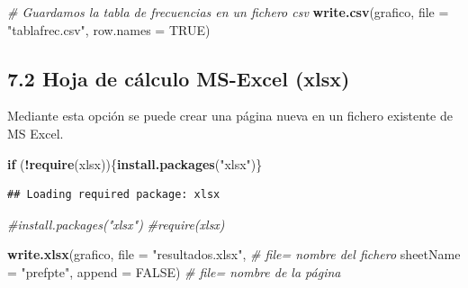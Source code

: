 \documentclass[
]{article}
\newenvironment{Shaded}{\begin{snugshade}}{\end{snugshade}}
\newcommand{\AttributeTok}[1]{\textcolor[rgb]{0.13,0.29,0.53}{#1}}
\newcommand{\CommentTok}[1]{\textcolor[rgb]{0.56,0.35,0.01}{\textit{#1}}}
\newcommand{\ConstantTok}[1]{\textcolor[rgb]{0.56,0.35,0.01}{#1}}
\newcommand{\ControlFlowTok}[1]{\textcolor[rgb]{0.13,0.29,0.53}{\textbf{#1}}}
\newcommand{\FunctionTok}[1]{\textcolor[rgb]{0.13,0.29,0.53}{\textbf{#1}}}
\newcommand{\NormalTok}[1]{#1}
\newcommand{\SpecialCharTok}[1]{\textcolor[rgb]{0.81,0.36,0.00}{\textbf{#1}}}
\newcommand{\StringTok}[1]{\textcolor[rgb]{0.31,0.60,0.02}{#1}}
\begin{document}
\begin{Shaded}
\begin{Highlighting}[]
\CommentTok{\# Guardamos la tabla de frecuencias en un fichero csv}
\FunctionTok{write.csv}\NormalTok{(grafico, }\AttributeTok{file =} \StringTok{"tablafrec.csv"}\NormalTok{, }\AttributeTok{row.names =} \ConstantTok{TRUE}\NormalTok{) }
\end{Highlighting}
\end{Shaded}

\hypertarget{hoja-de-cuxe1lculo-ms-excel-xlsx}{%
\subsection{7.2 Hoja de cálculo MS-Excel
(xlsx)}\label{hoja-de-cuxe1lculo-ms-excel-xlsx}}

Mediante esta opción se puede crear una página nueva en un fichero
existente de MS Excel.

\begin{Shaded}
\begin{Highlighting}[]
\ControlFlowTok{if}\NormalTok{ (}\SpecialCharTok{!}\FunctionTok{require}\NormalTok{(xlsx))\{}\FunctionTok{install.packages}\NormalTok{(}\StringTok{"xlsx"}\NormalTok{)\}}
\end{Highlighting}
\end{Shaded}

\begin{verbatim}
## Loading required package: xlsx
\end{verbatim}

\begin{Shaded}
\begin{Highlighting}[]
\CommentTok{\#install.packages("xlsx")}
\CommentTok{\#require(xlsx)}

\FunctionTok{write.xlsx}\NormalTok{(grafico, }\AttributeTok{file =} \StringTok{"resultados.xlsx"}\NormalTok{,               }\CommentTok{\# file= nombre del fichero}
           \AttributeTok{sheetName =} \StringTok{"prefpte"}\NormalTok{, }\AttributeTok{append =} \ConstantTok{FALSE}\NormalTok{)           }\CommentTok{\# file= nombre de la página}
\end{Highlighting}
\end{Shaded}
\end{document}
